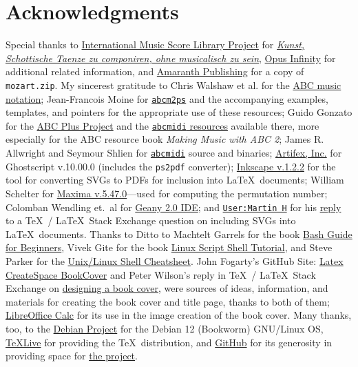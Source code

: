 \documentclass[a4paper,x11names,svgnames,10pt]{article}
\begin{document}
{\section{Acknowledgments}
Special thanks to \href{https://imslp.org}{International Music Score Library Project} for \href{https://imslp.org/wiki/Kunst\%2C\_Schottische\_Taenze\_zu\_componiren\%2C\_ohne_musicalisch\_zu\_sein\_(Gerlach\%2C\_Gustav)}{\it Kunst, Schottische Taenze zu componiren, ohne musicalisch zu sein}, \href{https://opus-infinity.org}{Opus Infinity} for additional related information, and \href{http://www.amaranthpublishing.com/MozartDiceGame.htm}{Amaranth Publishing} for a copy of {\tt mozart.zip}. My sincerest gratitude to Chris Walshaw et al. for the \href{http://www.abcnotation.com/}{ABC music notation}; Jean-Francois Moine for \href{http://moinejf.free.fr/}{\tt abcm2ps} and the accompanying examples, templates, and pointers for the appropriate use of these resources; Guido Gonzato for the \href{http://abcplus.sourceforge.net/}{ABC Plus Project} and the \href{http://abcplus.sourceforge.net/#abcMIDI}{{\tt abcmidi} resources} available there, more especially for the ABC resource book {\em Making Music with ABC 2}; James R. Allwright and Seymour Shlien for \href{http://abc.sourceforge.net/abcMIDI}{\tt abcmidi} source and binaries; \href{https://artifex.com/}{Artifex, Inc.} for Ghostscript v.10.00.0 (includes the {\tt ps2pdf} converter); \href{https://www.inkscape.org/}{Inkscape v.1.2.2} for the tool for converting SVGs to PDFs for inclusion into \LaTeX\ documents; William Schelter for \href{https://maxima.sourceforge.io}{Maxima v.5.47.0}---used for computing the permutation number; Colomban Wendling et.\ al for \href{https://www.geany.org}{Geany 2.0 IDE}; and \href{https://tex.stackexchange.com/users/632/martin-h}{\tt User:Martin H} for his \href{https://tex.stackexchange.com/questions/2099/how-to-include-svg-diagrams-in-latex}{reply} to a \TeX\ / \LaTeX\ Stack Exchange question on including SVGs into \LaTeX\ documents. Thanks to  Ditto to Machtelt Garrels for the book \href{http://tldp.org/LDP/Bash-Beginners-Guide/html/Bash-Beginners-Guide.html}{Bash Guide for Beginners}, Vivek Gite for the book \href{http://www.freeos.com/guides/lsst/}{Linux Script Shell Tutorial}, and Steve Parker for the \href{http://steve-parker.org/sh/cheatsheet.pdf}{Unix/Linux Shell Cheatsheet}. John Fogarty's GitHub Site: \href{https://github.com/jfogarty/latex-createspace-bookcover}{Latex CreateSpace BookCover} and Peter Wilson's reply in  \TeX\ / \LaTeX\ Stack Exchange on \href{https://tex.stackexchange.com/questions/17579/how-can-i-design-a-book-cover}{designing a book cover}, were sources of ideas, information, and materials for creating the book cover and title page, thanks to both of them; \href{http://www.libreoffice.org/}{LibreOffice Calc} for its use in the image creation of the book cover.  Many thanks, too, to the \href{https://www.debian.org}{Debian Project} for the Debian 12 (Bookworm) GNU/Linux OS, \href{http://www.tug.org/texlive/}{TeXLive} for providing the \TeX\ distribution,  and \href{https://github.com}{GitHub} for its generosity in providing space for \href{https://github.com/justineuro/mdgBookSVG6Kit}{the project}.  

}
\end{document}
